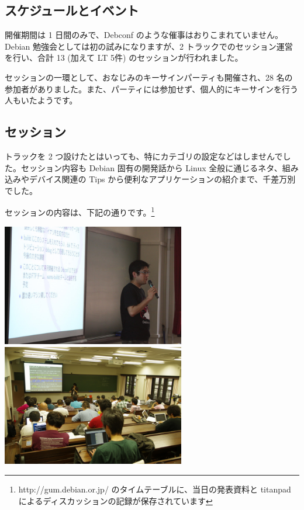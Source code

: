 \documentclass[mingoth,a4paper]{jsarticle}
\begin{document}
\subsection{スケジュールとイベント}

開催期間は 1 日間のみで、Debconf のような催事はおりこまれていません。Debian 勉強会としては初の試みになりますが、2 トラックでのセッション運営を行い、合計 13 (加えて LT 5件) のセッションが行われました。

セッションの一環として、おなじみのキーサインパーティも開催され、28 名の参加者がありました。また、パーティには参加せず、個人的にキーサインを行う人もいたようです。

\subsection{セッション}

トラックを 2 つ設けたとはいっても、特にカテゴリの設定などはしませんでした。セッション内容も Debian 固有の開発話から Linux 全般に通じるネタ、組み込みやデバイス関連の Tips から便利なアプリケーションの紹介まで、千差万別でした。

セッションの内容は、下記の通りです。\footnote{http://gum.debian.or.jp/ のタイムテーブルに、当日の発表資料と titanpad によるディスカッションの記録が保存されています}

\includegraphics[width=8cm]{image201206/gum2012-session2.jpg}
\includegraphics[width=8cm]{image201206/gum2012-session1.jpg}
\end{document}
